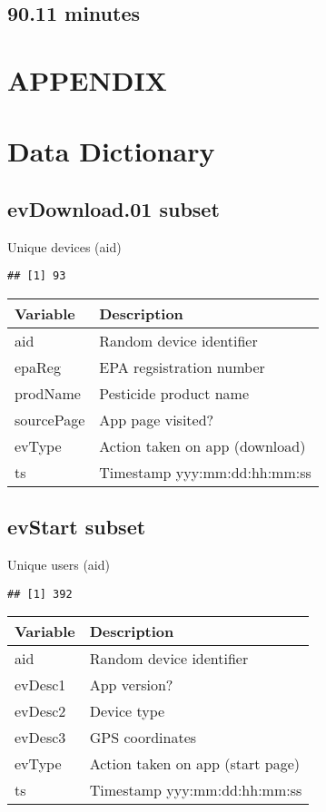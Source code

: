 \documentclass[
]{article}
\begin{document}
\hypertarget{minutes}{%
\subsection{90.11 minutes}\label{minutes}}

\hypertarget{appendix}{%
\section{APPENDIX}\label{appendix}}

\hypertarget{data-dictionary}{%
\section{Data Dictionary}\label{data-dictionary}}

\hypertarget{evdownload.01-subset}{%
\subsection{evDownload.01 subset}\label{evdownload.01-subset}}

Unique devices (aid)

\begin{verbatim}
## [1] 93
\end{verbatim}

\begin{longtable}[]{@{}ll@{}}
\toprule
Variable & Description \\
\midrule
\endhead
aid & Random device identifier \\
epaReg & EPA regsistration number \\
prodName & Pesticide product name \\
sourcePage & App page visited? \\
evType & Action taken on app (download) \\
ts & Timestamp yyy:mm:dd:hh:mm:ss \\
\bottomrule
\end{longtable}

\hypertarget{evstart-subset}{%
\subsection{evStart subset}\label{evstart-subset}}

Unique users (aid)

\begin{verbatim}
## [1] 392
\end{verbatim}

\begin{longtable}[]{@{}ll@{}}
\toprule
Variable & Description \\
\midrule
\endhead
aid & Random device identifier \\
evDesc1 & App version? \\
evDesc2 & Device type \\
evDesc3 & GPS coordinates \\
evType & Action taken on app (start page) \\
ts & Timestamp yyy:mm:dd:hh:mm:ss \\
\bottomrule
\end{longtable}
\end{document}
